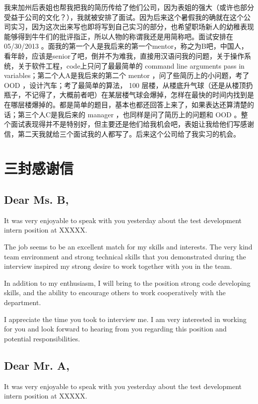 \documentclass[12pt]{book}
\begin{document}
我来加州后表姐也帮我把我的简历传给了他们公司，因为表姐的强大（或许也部分受益于公司的文化？），我就被安排了面试。因为后来这个暑假我的确就在这个公司实习，因为这次出来写也即将写到自己实习的部分，也希望职场新人的幼稚表现能够得到牛牛们的批评指正，所以人物的称谓我还是用简称吧。面试安排在 05/30/2013 。面我的第一个人是我后来的第一个mentor，称之为B吧，中国人，看年龄，应该是senior了吧，倒并不为难我，直接用汉语问我的问题，关于操作系统，关于软件工程，code上只问了最最简单的 command line arguments pass in variables；第二个人A是我后来的第二个 mentor ，问了些简历上的小问题，考了 OOD ，设计汽车；考了最简单的算法， 100 层楼，从楼底升气球（还是从楼顶扔瓶子，不记得了，大概前者吧）在某层楼气球会爆掉，怎样在最快的时间内找到是在哪层楼爆掉的。都是简单的题目，基本也都还回答上来了，如果表达还算清楚的话；第三个人C是我后来的 manager ，也同样是问了简历上的问题和 OOD 。整个面试表现得并不是特别好，但主要还是他们给我机会吧，表姐让我给他们写感谢信，第二天我就给三个面试我的人都写了。后来这个公司给了我实习的机会。

\section{三封感谢信}
\label{sec-5-2}
\subsection{Dear Ms. B,}
\label{sec-5-2-1}

It was very enjoyable to speak with you yesterday about the test development intern position at XXXXX.

The job seems to be an excellent match for my skills and interests. The very kind team environment and strong technical skills that you demonstrated during the interview inspired my strong desire to work together with you in the team.

In addition to my enthusiasm, I will bring to the position strong code developing skills, and the ability to encourage others to work cooperatively with the department.

I appreciate the time you took to interview me. I am very interested in working for you and look forward to hearing from you regarding this position and potential responsibilities.

\subsection{Dear Mr. A,}
\label{sec-5-2-2}

It was very enjoyable to speak with you yesterday about the test development intern position at XXXXX.
\end{document}
